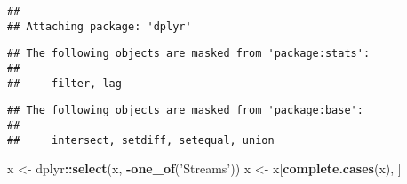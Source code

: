 \documentclass[
]{article}
\newenvironment{Shaded}{\begin{snugshade}}{\end{snugshade}}
\newcommand{\KeywordTok}[1]{\textcolor[rgb]{0.13,0.29,0.53}{\textbf{#1}}}
\newcommand{\NormalTok}[1]{#1}
\newcommand{\OperatorTok}[1]{\textcolor[rgb]{0.81,0.36,0.00}{\textbf{#1}}}
\newcommand{\StringTok}[1]{\textcolor[rgb]{0.31,0.60,0.02}{#1}}
\begin{document}
\begin{Shaded}
\end{Shaded}

\begin{verbatim}
## 
## Attaching package: 'dplyr'
\end{verbatim}

\begin{verbatim}
## The following objects are masked from 'package:stats':
## 
##     filter, lag
\end{verbatim}

\begin{verbatim}
## The following objects are masked from 'package:base':
## 
##     intersect, setdiff, setequal, union
\end{verbatim}

\begin{Shaded}
\begin{Highlighting}[]
\NormalTok{x <-}\StringTok{ }\NormalTok{dplyr}\OperatorTok{::}\KeywordTok{select}\NormalTok{(x, }\OperatorTok{-}\KeywordTok{one_of}\NormalTok{(}\StringTok{'Streams'}\NormalTok{))}
\NormalTok{x <-}\StringTok{ }\NormalTok{x[}\KeywordTok{complete.cases}\NormalTok{(x), ]}
\end{Highlighting}
\end{Shaded}
\end{document}
